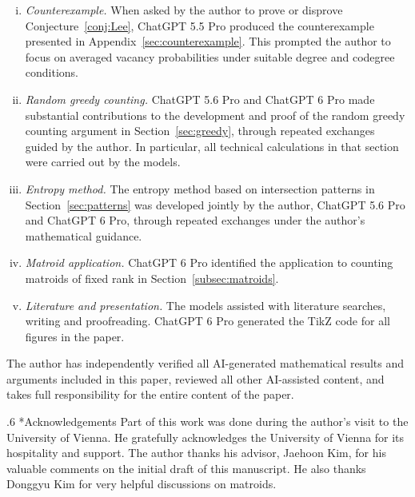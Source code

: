 \documentclass[11pt,reqno]{amsart}
\makeatletter
\numberwithin{equation}{section}
\renewcommand{\section}{\@startsection{section}{1}%
    \z@{1.3\linespacing\@plus.5\linespacing\@minus.2\linespacing}%
    {.6\linespacing}%
    {\normalfont\scshape\centering}}
\theoremstyle{plain}
\theoremstyle{definition}
\makeatother
\begin{document}
\begin{enumerate}[(i)]
    \item \emph{Counterexample.}
        When asked by the author to prove or disprove Conjecture~\ref{conj:Lee}, ChatGPT 5.5 Pro produced
        the counterexample presented in Appendix~\ref{sec:counterexample}.
        This prompted the author to focus on averaged vacancy
        probabilities under suitable degree and codegree conditions.

    \item \emph{Random greedy counting.}
        ChatGPT 5.6 Pro and ChatGPT 6 Pro made substantial
        contributions to the development and proof of the random
        greedy counting argument in Section~\ref{sec:greedy},
        through repeated exchanges guided by the author.
        In particular, all technical calculations in that section were carried out by the models.

    \item \emph{Entropy method.}
        The entropy method based on intersection patterns in
        Section~\ref{sec:patterns} was developed jointly by
        the author, ChatGPT 5.6 Pro and ChatGPT 6 Pro,
        through repeated exchanges under the author's
        mathematical guidance.

    \item \emph{Matroid application.}
        ChatGPT 6 Pro identified the application to counting
        matroids of fixed rank in Section~\ref{subsec:matroids}.

    \item \emph{Literature and presentation.}
        The models assisted with literature searches, writing
        and proofreading.
        ChatGPT 6 Pro generated the TikZ code for all figures
        in the paper.
\end{enumerate}

The author has independently verified all AI-generated mathematical
results and arguments included in this paper, reviewed all other
AI-assisted content, and takes full responsibility for the entire
content of the paper.


\section*{Acknowledgements}
Part of this work was done during the author's visit to the University of Vienna. He gratefully acknowledges the University of Vienna for its hospitality and support.
The author thanks his advisor, Jaehoon Kim, for his valuable comments on the initial draft of this manuscript. He also thanks Donggyu Kim for very helpful discussions on matroids.
\end{document}
